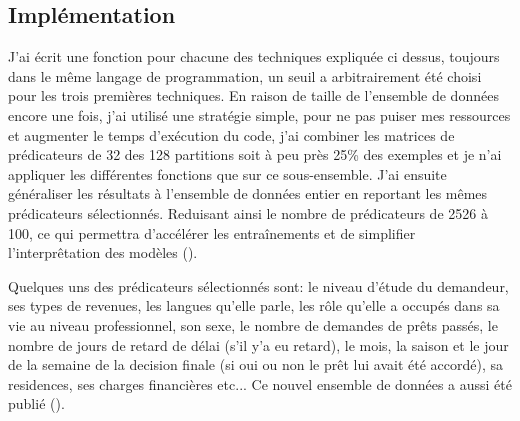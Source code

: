 \subsection{Implémentation}
\label{chap3.sec2.sub2}
J'ai écrit une fonction pour chacune des techniques expliquée ci dessus, toujours dans le même langage de programmation, un seuil a arbitrairement été choisi pour les trois premières techniques. En raison de taille de l'ensemble de données encore une fois, j'ai utilisé une stratégie simple, pour ne pas puiser mes ressources et augmenter le temps d'exécution du code, j'ai combiner les matrices de prédicateurs de 32 des 128 partitions soit à peu près 25\% des exemples et je n'ai appliquer les différentes fonctions que sur ce sous-ensemble. J'ai ensuite généraliser les résultats à l'ensemble de données entier en reportant les mêmes prédicateurs sélectionnés. Reduisant ainsi le nombre de prédicateurs de 2526 à 100, ce qui permettra d'accélérer les entraînements et de simplifier l'interprêtation des modèles (\cite{diarra2024featureselection}).

Quelques uns des prédicateurs sélectionnés sont: le niveau d’étude du demandeur, ses types de revenues, les langues qu’elle parle, les rôle qu’elle a occupés dans sa vie au niveau professionnel, son sexe, le nombre de demandes de prêts passés, le nombre de jours de retard de délai (s’il y’a eu retard), le mois, la saison et le jour de la semaine de la decision finale (si oui ou non le prêt lui avait été accordé), sa residences, ses charges financières etc... Ce nouvel ensemble de données a aussi été publié (\cite{diarra2024deep}).